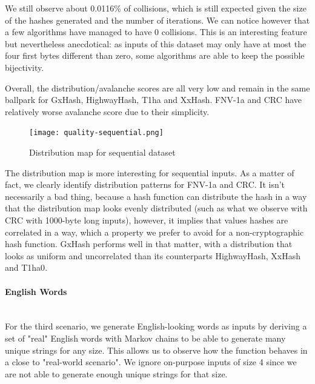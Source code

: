 \documentclass[10pt]{article}
\begin{document}
We still observe about 0.0116\% of collisions, which is still expected given the size of the hashes generated and the number of iterations. We can notice however that a few algorithms have managed to have 0 collisions. This is an interesting feature but nevertheless anecdotical: as inputs of this dataset may only have at most the four first bytes different than zero, some algorithms are able to keep the possible bijectivity.

Overall, the distribution/avalanche scores are all very low and remain in the same ballpark for GxHash, HighwayHash, T1ha and XxHash. FNV-1a and CRC have relatively worse avalanche score due to their simplicity.

\begin{figure}[H]
\centering
\texttt{[image: quality-sequential.png]}
\caption{Distribution map for sequential dataset}
\label{fig:quality-sequential}
\end{figure}

The distribution map is more interesting for sequential inputs. As a matter of fact, we clearly identify distribution patterns for FNV-1a and CRC. It isn't necessarily a bad thing, because a hash function can distribute the hash in a way that the distribution map looks evenly distributed (such as what we observe with CRC with 1000-byte long inputs), however, it implies that values hashes are correlated in a way, which a property we prefer to avoid for a non-cryptographic hash function. GxHash performs well in that matter, with a distribution that looks as uniform and uncorrelated than its counterparts HighwayHash\cite{highwayhash}, XxHash\cite{xxhash} and T1ha0\cite{rust-t1ha}.

\clearpage
\paragraph{English Words}\leavevmode\\
For the third scenario, we generate English-looking words as inputs by deriving a set of "real" English words with Markov chains to be able to generate many unique strings for any size. This allows us to observe how the function behaves in a close to "real-world scenario". We ignore on-purpose inputs of size 4 since we are not able to generate enough unique strings for that size.
\end{document}
